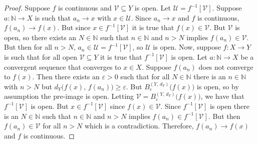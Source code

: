 \documentclass{article}
\theoremstyle{plain}
\theoremstyle{normal}
\begin{document}
        \begin{proof}
            Suppose $f$ is continuous and $\mathcal{V}\subseteq{Y}$ is open.
            Let $\mathcal{U}=f^{-1}[\mathcal{V}]$. Suppose
            $a:\mathbb{N}\rightarrow{X}$ is such that
            $a_{n}\rightarrow{x}$ with $x\in\mathcal{U}$. Since
            $a_{n}\rightarrow{x}$ and $f$ is continuous,
            $f(a_{n})\rightarrow{f}(x)$. But since $x\in{f}^{-1}[\mathcal{V}]$
            it is true that $f(x)\in\mathcal{V}$. But $\mathcal{V}$ is open, so
            there exists an $N\in\mathbb{N}$ such that $n\in\mathbb{N}$ and
            $n>N$ implies $f(a_{n})\in\mathcal{V}$. But then for all
            $n>N$, $a_{n}\in\mathcal{U}=f^{-1}[\mathcal{V}]$, so
            $\mathcal{U}$ is open. Now, suppose $f:X\rightarrow{Y}$ is such
            that for all open $\mathcal{V}\subseteq{Y}$ it is true that
            $f^{-1}[\mathcal{V}]$ is open. Let
            $a:\mathbb{N}\rightarrow{X}$ be a convergent sequence that
            converges to $x\in{X}$. Suppose
            $f(a_{n})$ does not converge to $f(x)$. Then there exists an
            $\varepsilon>0$ such that for all $N\in\mathbb{N}$ there is an
            $n\in\mathbb{N}$ with $n>N$ but
            $d_{Y}\big(f(x),\,f(a_{n})\big)\geq\varepsilon$. But
            $B_{\varepsilon}^{(Y,\,d_{Y})}\big(f(x)\big)$ is open, so by
            assumption the pre-image is open. Letting
            $\mathcal{V}=B_{\varepsilon}^{(Y,\,d_{Y})}\big(f(x)\big)$, we have
            that $f^{-1}[\mathcal{V}]$ is open. But $x\in{f}^{-1}[\mathcal{V}]$
            since $f(x)\in\mathcal{V}$. Since $f^{-1}[\mathcal{V}]$ is open
            there is an $N\in\mathbb{N}$ such that $n\in\mathbb{N}$ and
            $n>N$ implies $f(a_{n})\in{f}^{-1}[\mathcal{V}]$. But then
            $f(a_{n})\in\mathcal{V}$ for all $n>N$ which is a contradiction.
            Therefore, $f(a_{n})\rightarrow{f}(x)$ and $f$ is continuous.
        \end{proof}
\end{document}

